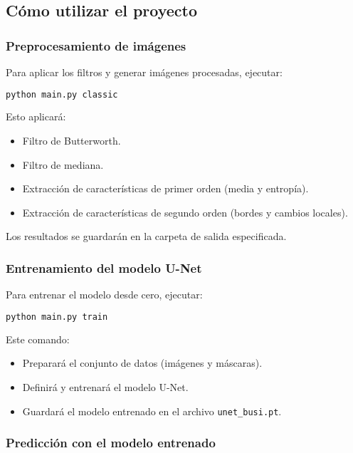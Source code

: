 \documentclass[12pt]{article}
\begin{document}
\subsection{Cómo utilizar el proyecto}

\subsubsection{Preprocesamiento de imágenes}

Para aplicar los filtros y generar imágenes procesadas, ejecutar:

\begin{lstlisting}[language=bash]
python main.py classic
\end{lstlisting}

Esto aplicará:
\begin{itemize}
    \item Filtro de Butterworth.
    \item Filtro de mediana.
    \item Extracción de características de primer orden (media y entropía).
    \item Extracción de características de segundo orden (bordes y cambios locales).
\end{itemize}

Los resultados se guardarán en la carpeta de salida especificada.

\subsubsection{Entrenamiento del modelo U-Net}

Para entrenar el modelo desde cero, ejecutar:

\begin{lstlisting}[language=bash]
python main.py train
\end{lstlisting}

Este comando:
\begin{itemize}
    \item Preparará el conjunto de datos (imágenes y máscaras).
    \item Definirá y entrenará el modelo U-Net.
    \item Guardará el modelo entrenado en el archivo \texttt{unet\_busi.pt}.
\end{itemize}

\subsubsection{Predicción con el modelo entrenado}
\end{document}
